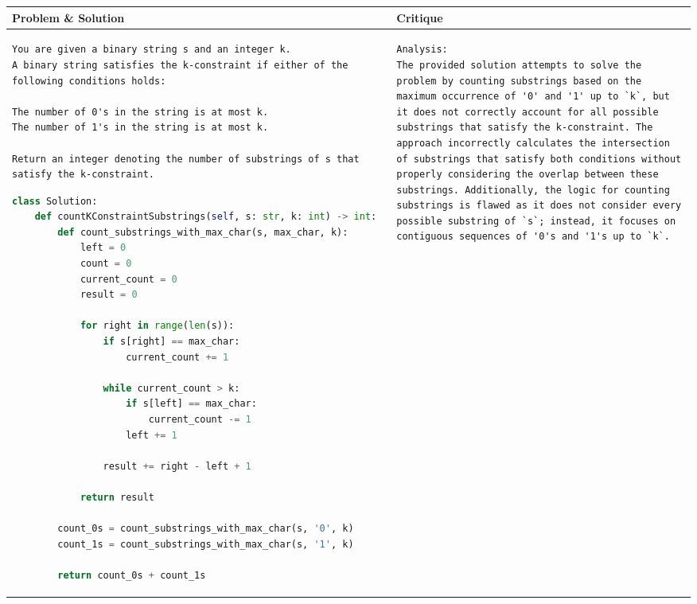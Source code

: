 \begin{table}[]
    \centering
    \small
    \caption{A sample problem from LiveCodeBench~\cite{jain2024livecodebench}, with by the solution generated by Qwen2.5-Coder and the critique provided by the {\ours} critic.}
    \label{tab:lcb_sample}
\begin{longtable}{m{}m{}}
\toprule
\textbf{Problem \& Solution}  &
\textbf{Critique} \\ 
\midrule
\begin{lstlisting}[frame=none,
    backgroundcolor=\color{white},
    numbers=none,
    xleftmargin=0pt,
    framexleftmargin=0pt,
    framexrightmargin=0pt,
    framextopmargin=0pt,
    framexbottommargin=0pt]
You are given a binary string s and an integer k.
A binary string satisfies the k-constraint if either of the following conditions holds:

The number of 0's in the string is at most k.
The number of 1's in the string is at most k.

Return an integer denoting the number of substrings of s that satisfy the k-constraint.
\end{lstlisting}

\begin{lstlisting}[language=python]
class Solution:
    def countKConstraintSubstrings(self, s: str, k: int) -> int:
        def count_substrings_with_max_char(s, max_char, k):
            left = 0
            count = 0
            current_count = 0
            result = 0
            
            for right in range(len(s)):
                if s[right] == max_char:
                    current_count += 1
                
                while current_count > k:
                    if s[left] == max_char:
                        current_count -= 1
                    left += 1
                
                result += right - left + 1
            
            return result
        
        count_0s = count_substrings_with_max_char(s, '0', k)
        count_1s = count_substrings_with_max_char(s, '1', k)
        
        return count_0s + count_1s
\end{lstlisting}
 &
\begin{lstlisting}[frame=none,
    backgroundcolor=\color{white},
    numbers=none,
    xleftmargin=0pt,
    framexleftmargin=0pt,
    framexrightmargin=0pt,
    framextopmargin=0pt,
    framexbottommargin=0pt]
Analysis:
The provided solution attempts to solve the problem by counting substrings based on the maximum occurrence of '0' and '1' up to `k`, but it does not correctly account for all possible substrings that satisfy the k-constraint. The approach incorrectly calculates the intersection of substrings that satisfy both conditions without properly considering the overlap between these substrings. Additionally, the logic for counting substrings is flawed as it does not consider every possible substring of `s`; instead, it focuses on contiguous sequences of '0's and '1's up to `k`.


\end{lstlisting}
\end{longtable}
\end{table}

